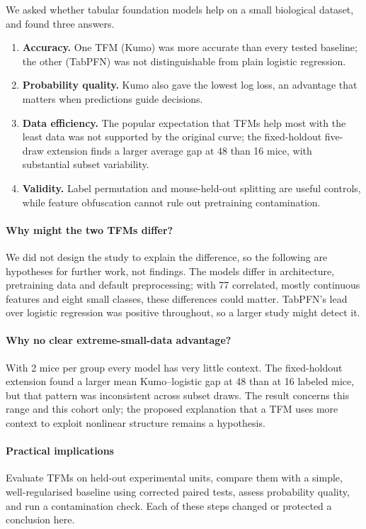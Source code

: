 \documentclass[10pt]{article}
\begin{document}
We asked whether tabular foundation models help on a small biological dataset, and found three
answers.
\begin{enumerate}[label=\textbf{RQ\arabic*.}, leftmargin=2.8em]
\item \textbf{Accuracy.} One TFM (Kumo) was more accurate than every tested
  baseline; the other (TabPFN) was not distinguishable from plain logistic regression.
\item \textbf{Probability quality.} Kumo also gave the lowest log loss, an advantage that matters
  when predictions guide decisions.
\item \textbf{Data efficiency.} The popular expectation that TFMs help most with the least data
  was not supported by the original curve; the fixed-holdout five-draw extension finds a
  larger average gap at 48 than 16 mice, with substantial subset variability.
\item \textbf{Validity.} Label permutation and mouse-held-out splitting are useful controls,
  while feature obfuscation cannot rule out pretraining contamination.
\end{enumerate}

\paragraph{Why might the two TFMs differ?} We did not design the study to explain the difference,
so the following are hypotheses for further work, not findings. The models differ in
architecture, pretraining data and default preprocessing; with 77 correlated, mostly
continuous features and eight small classes, these differences could matter. TabPFN's lead over
logistic regression was positive throughout, so a larger study might detect it.

\paragraph{Why no clear extreme-small-data advantage?} With 2 mice per group every model has
very little context. The fixed-holdout extension found a larger mean Kumo--logistic gap at
48 than at 16 labeled mice, but that pattern was inconsistent across subset draws. The
result concerns this range and this cohort only; the proposed explanation that a TFM uses
more context to exploit nonlinear structure remains a hypothesis.

\paragraph{Practical implications} Evaluate TFMs on held-out experimental units, compare them
with a simple, well-regularised baseline using corrected paired tests, assess probability quality, and
run a contamination check. Each of these steps changed or protected a conclusion here.
\end{document}
